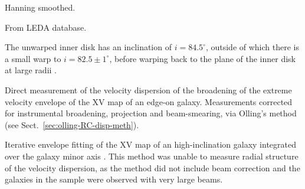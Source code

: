 \documentclass[traditabstract]{aa} %
\begin{document}
\begin{table}[t]
\begin{footnotesize}
\begin{list}{}{}
\item[$^{\mathrm{a}}$] Hanning smoothed.
\item[$^{\mathrm{b}}$] From LEDA database.
\item[$^{\mathrm{c}}$] The unwarped inner disk has an inclination of
    $i=84.5^{\circ}$, outside of which there is a small warp to
    $i=82.5\pm1^{\circ}$, before warping back to the plane of the
    inner disk at large radii \citep{olling1996a}.
\item[$^{\mathrm{d}}$] Direct measurement of the velocity dispersion of the
    broadening of the extreme velocity envelope of the XV map of an
    edge-on galaxy. Measurements corrected for instrumental
    broadening, projection and beam-smearing, via Olling's method (see
    Sect.~\ref{sec:olling-RC-disp-meth}).
\item[$^{\mathrm{e}}$] Iterative envelope fitting of the XV map of 
an high-inclination galaxy
    integrated over the galaxy minor axis \citep{kvdkdb2004}. This
    method was unable to measure radial structure of the velocity
    dispersion, as the method did not include beam correction and the
    galaxies in the sample were observed with very large beams.
\end{list}
\end{footnotesize}
\end{table}
\end{document}
